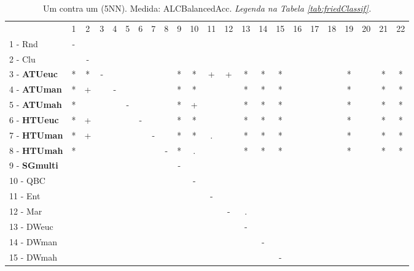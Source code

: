 \begin{table}[h]
\caption{Um contra um (5NN). Medida: ALCBalancedAcc. \textit{Legenda na Tabela \ref{tab:friedClassif}.}}
\begin{center}\begin{tabular}{lcc|cc|cc|cc|cc|cc|cc|cc|cc|cc|cc}
 			& 1 & 2 & 3 & 4 & 5 & 6 & 7 & 8 & 9 & 10 & 11 & 12 & 13 & 14 & 15 & 16 & 17 & 18 & 19 & 20 & 21 & 22\\
1 - Rnd  	& - &   &   &   &   &   &   &   &   &   &   &   &   &   &   &   &   &   &   &   &   &   \\
2 - Clu  	&   & - &   &   &   &   &   &   &   &   &   &   &   &   &   &   &   &   &   &   &   &   \\ \hline
3 - \textbf{ATUeuc}	& * & * & - &   &   &   &   &   & * & * & + & + & * & * & * &   &   &   & * &   & * & * \\
4 - \textbf{ATUman}	& * & + &   & - &   &   &   &   & * & * &   &   & * & * & * &   &   &   & * &   & * & * \\ \hline
5 - \textbf{ATUmah}	& * &   &   &   & - &   &   &   & * & + &   &   & * & * & * &   &   &   & * &   & * & * \\
6 - \textbf{HTUeuc}	& * & + &   &   &   & - &   &   & * & * &   &   & * & * & * &   &   &   & * &   & * & * \\ \hline
7 - \textbf{HTUman}	& * & + &   &   &   &   & - &   & * & * & . &   & * & * & * &   &   &   & * &   & * & * \\
8 - \textbf{HTUmah}	& * &   &   &   &   &   &   & - & * & . &   &   & * & * & * &   &   &   & * &   & * & * \\ \hline
9 - \textbf{SGmulti}	&   &   &   &   &   &   &   &   & - &   &   &   &   &   &   &   &   &   &   &   &   &   \\
10 - QBC  	&   &   &   &   &   &   &   &   &   & - &   &   &   &   &   &   &   &   &   &   &   &   \\ \hline
11 - Ent  	&   &   &   &   &   &   &   &   &   &   & - &   &   &   &   &   &   &   &   &   &   &   \\
12 - Mar  	&   &   &   &   &   &   &   &   &   &   &   & - & . &   &   &   &   &   &   &   &   &   \\ \hline
13 - DWeuc	&   &   &   &   &   &   &   &   &   &   &   &   & - &   &   &   &   &   &   &   &   &   \\
14 - DWman	&   &   &   &   &   &   &   &   &   &   &   &   &   & - &   &   &   &   &   &   &   &   \\ \hline
15 - DWmah	&   &   &   &   &   &   &   &   &   &   &   &   &   &   & - &   &   &   &   &   &   &   \\

\end{tabular}
\end{center}
\end{table}
